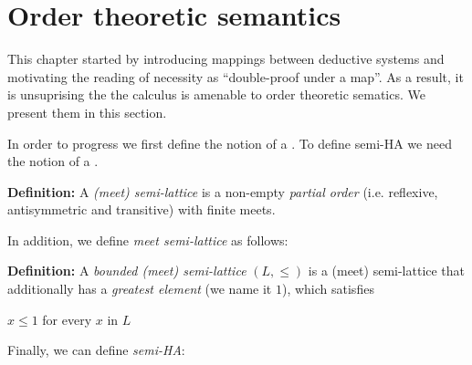 			
			
			
			
			\chapter{Order theoretic semantics}
			\label{jcalcsem}
			This chapter started by introducing 
			mappings between deductive systems and 
			motivating the reading of necessity as ``double-proof under a map''.
			As a result, it is unsuprising the the calculus is amenable to order theoretic sematics.
			We present them in this section.

			In order to progress we first define the notion of a 
			. 
			To define semi-HA we need the notion of a .
			  
			
			\begin{mdframed}
			\textbf{Definition:}
			A \textit{(meet) semi-lattice} is a non-empty \emph{partial order} (i.e. reflexive, antisymmetric and transitive) 
			with finite meets.
			\end{mdframed}
			In addition, we define \emph{meet semi-lattice} as follows: 
			\begin{mdframed}
			\textbf{Definition:}
			A \textit{bounded (meet) semi-lattice} $(L,\le)$ is a (meet) 
			semi-lattice that additionally has 
			a \emph{greatest element} (we name it $1$), which satisfies
			
			$x \le 1$ for every $x$ in $L$
			\end{mdframed}
			Finally, we can define \emph{semi-HA}:
			
